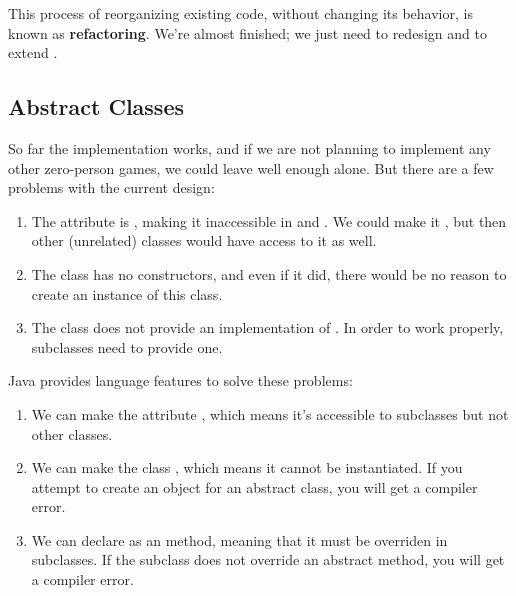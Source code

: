 
This process of reorganizing existing code, without changing its behavior, is known as {\bf refactoring}.
We're almost finished; we just need to redesign  and  to extend .


\subsection*{Abstract Classes}

So far the implementation works, and if we are not planning to implement any other zero-person games, we could leave well enough alone.
But there are a few problems with the current design:

\begin{enumerate}

\item The  attribute is , making it inaccessible in  and .
We could make it , but then other (unrelated) classes would have access to it as well.

\item The  class has no constructors, and even if it did, there would be no reason to create an instance of this class.

\item The  class does not provide an implementation of .
In order to work properly, subclasses need to provide one.

\end{enumerate}


Java provides language features to solve these problems:

\begin{enumerate}

\item We can make the  attribute , which means it's accessible to subclasses but not other classes.

\item We can make the class , which means it cannot be instantiated.
If you attempt to create an object for an abstract class, you will get a compiler error.

\item We can declare  as an  method, meaning that it must be overriden in subclasses.
If the subclass does not override an abstract method, you will get a compiler error.
\end{enumerate}

